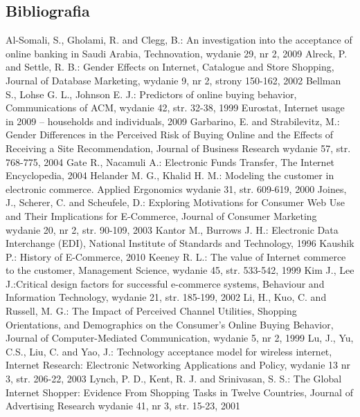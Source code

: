 {  \subsection{Bibliografia}
  \vspace{-40pt}
    \begin{thebibliography}{5}
     Al-Somali, S., Gholami, R. and Clegg, B.: An investigation into the acceptance of online banking in Saudi Arabia, Technovation, wydanie 29, nr 2, 2009
     Alreck, P. and Settle, R. B.: Gender Effects on Internet, Catalogue and Store Shopping, Journal of Database Marketing, wydanie 9, nr 2, strony 150-162, 2002
     Bellman S., Lohse G. L., Johnson E. J.: Predictors of online buying behavior, Communications of ACM, wydanie 42, str. 32-38, 1999
     Eurostat, Internet usage in 2009 – households and individuals, 2009
     Garbarino, E. and Strabilevitz, M.: Gender Differences in the Perceived Risk of Buying Online and the Effects of Receiving a Site Recommendation, Journal of Business Research wydanie 57, str. 768-775, 2004
     Gate R., Nacamuli A.: Electronic Funds Transfer, The Internet Encyclopedia, 2004 
     Helander M. G., Khalid H. M.: Modeling the customer in electronic commerce. Applied Ergonomics wydanie 31, str. 609-619, 2000
     Joines, J., Scherer, C. and Scheufele, D.: Exploring Motivations for Consumer Web Use and Their Implications for E-Commerce, Journal of Consumer Marketing wydanie 20, nr 2, str. 90-109, 2003
     Kantor M., Burrows J. H.: Electronic Data Interchange (EDI), National Institute of Standards and Technology, 1996
     Kaushik P.: History of E-Commerce, 2010
     Keeney R. L.: The value of Internet commerce to the customer, Management Science, wydanie 45, str. 533-542, 1999
     Kim J., Lee J.:Critical design factors for successful e-commerce systems, Behaviour and Information Technology, wydanie 21, str. 185-199, 2002
     Li, H., Kuo, C. and Russell, M. G.: The Impact of Perceived Channel Utilities, Shopping Orientations, and Demographics on the Consumer's Online Buying Behavior, Journal of Computer-Mediated Communication, wydanie 5, nr 2, 1999
     Lu, J., Yu, C.S., Liu, C. and Yao, J.: Technology acceptance model for wireless internet, Internet Research: Electronic Networking Applications and Policy, wydanie 13 nr 3, str. 206-22, 2003
     Lynch, P. D., Kent, R. J. and Srinivasan, S. S.: The Global Internet Shopper: Evidence From Shopping Tasks in Twelve Countries, Journal of Advertising Research wydanie 41, nr 3, str. 15-23, 2001

\end{thebibliography}}
